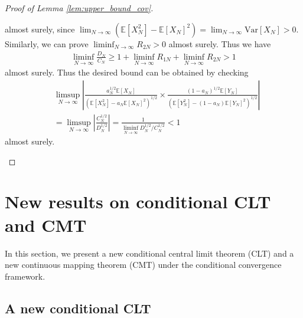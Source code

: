 \documentclass[12pt]{article}
\newcommand{\E}{\mathbb E}								%
\begin{document}
\begin{proof}[Proof of Lemma \ref{lem:upper_bound_cov}]
\begin{enumerate}
	almost surely, since $\lim_{N\rightarrow\infty}(\E[X_N^2]-\E[X_N]^2)=\lim_{N\rightarrow\infty}\mathrm{Var}[X_N]>0$. Similarly, we can prove $\liminf_{N\rightarrow\infty}R_{2N} >0$ almost surely. Thus we have 
	\begin{align*}
		\liminf_{N\rightarrow\infty}\frac{D_N}{C_N}\geq 1+\liminf_{N\rightarrow\infty}R_{1N}+\liminf_{N\rightarrow\infty}R_{2N}>1
	\end{align*}
	almost surely. Thus the desired bound can be obtained by checking
	\begin{align*}
		&
		\limsup_{N\rightarrow\infty}\left|\frac{a_N^{1/2}\E[X_N]}{(\E[X_N^2]-a_N\E[X_N]^2)^{1/2}}\times \frac{(1-a_N)^{1/2}\E[Y_N]}{(\E[Y_N^2]-(1-a_N)\E[Y_N]^2)^{1/2}}\right|\\
		&
		=
		\limsup_{N\rightarrow\infty}\left|\frac{C_N^{1/2}}{D_N^{1/2}}\right|=\frac{1}{\liminf_{N\rightarrow\infty}D_N^{1/2}/C_N^{1/2}}<1
	\end{align*}
	almost surely.
	\end{enumerate}
	
\end{proof}



\section{New results on conditional CLT and CMT}\label{sec:new_conditional_CLT}


In this section, we present a new conditional central limit theorem (CLT) and a new continuous mapping theorem (CMT) under the conditional convergence framework. 

\subsection{A new conditional CLT}
\end{document}

